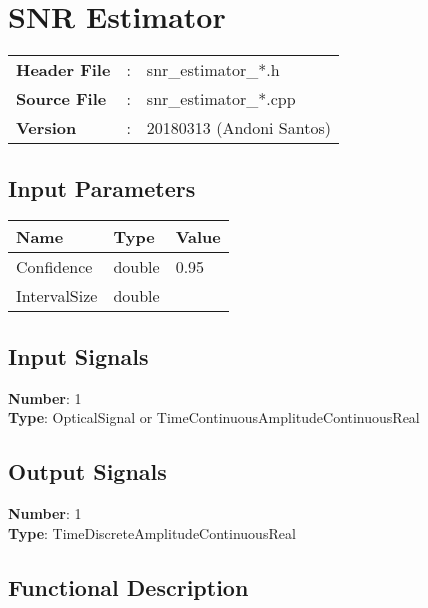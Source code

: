 \clearpage

\section{SNR Estimator}

\begin{tcolorbox}	
	\begin{tabular}{p{2.75cm} p{0.2cm} p{10.5cm}} 	
		\textbf{Header File}   &:& snr\_estimator\_*.h \\
		\textbf{Source File}   &:& snr\_estimator\_*.cpp \\
		\textbf{Version}	   &:& 20180313 (Andoni Santos)
	\end{tabular}
\end{tcolorbox}

\subsection*{Input Parameters}

\begin{table}[H]
	\centering
	\begin{tabular}{|l|l|l|}
		\hline
		\textbf{Name}  & \textbf{Type}  & \textbf{Value}    \\ \hline
		Confidence     & double         & 0.95              \\ \hline
		IntervalSize& double			& 					\\ \hline
	\end{tabular}
\end{table}

\subsection*{Input Signals}

\textbf{Number}: 1\\
\textbf{Type}: OpticalSignal or TimeContinuousAmplitudeContinuousReal

\subsection*{Output Signals}

\textbf{Number}: 1\\
\textbf{Type}: TimeDiscreteAmplitudeContinuousReal

\subsection*{Functional Description}

